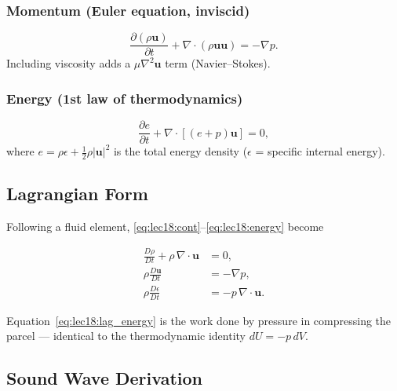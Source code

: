\subsubsection*{Momentum (Euler equation, inviscid)}
\begin{equation}
  \frac{\partial(\rho\mathbf{u})}{\partial t}
  + \nabla\cdot(\rho\mathbf{u}\mathbf{u}) = -\nabla p.
  \label{eq:lec18:momentum}
\end{equation}
Including viscosity adds a $\mu\nabla^2\mathbf{u}$ term (Navier–Stokes).

\subsubsection*{Energy (1st law of thermodynamics)}
\begin{equation}
  \frac{\partial e}{\partial t}
  + \nabla\cdot\!\left[(e+p)\mathbf{u}\right] = 0,
  \label{eq:lec18:energy}
\end{equation}
where $e = \rho\epsilon + \tfrac{1}{2}\rho|\mathbf{u}|^2$
is the total energy density ($\epsilon$ = specific internal energy).

\subsection{Lagrangian Form}\label{subsec:lec18:lagrangian}

Following a fluid element, \eqref{eq:lec18:cont}–\eqref{eq:lec18:energy} become

\begin{align}
  \frac{D\rho}{Dt} + \rho\,\nabla\cdot\mathbf{u} &= 0,
  \label{eq:lec18:lag_cont}\\
  \rho\frac{D\mathbf{u}}{Dt} &= -\nabla p,
  \label{eq:lec18:lag_mom}\\
  \rho\frac{D\epsilon}{Dt} &= -p\,\nabla\cdot\mathbf{u}.
  \label{eq:lec18:lag_energy}
\end{align}

Equation~\eqref{eq:lec18:lag_energy} is the work done by pressure
in compressing the parcel — identical to the thermodynamic identity
$dU = -p\, dV$.

\subsection{Sound Wave Derivation}\label{subsec:lec18:sound}

